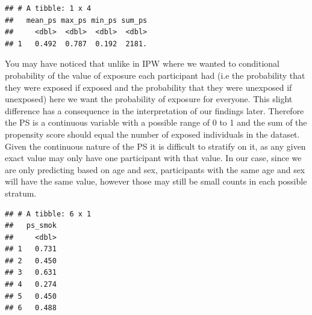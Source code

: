 \documentclass[
]{book}
\newenvironment{Shaded}{\begin{snugshade}}{\end{snugshade}}
\newcommand{\DataTypeTok}[1]{\textcolor[rgb]{0.13,0.29,0.53}{#1}}
\newcommand{\KeywordTok}[1]{\textcolor[rgb]{0.13,0.29,0.53}{\textbf{#1}}}
\newcommand{\NormalTok}[1]{#1}
\newcommand{\OperatorTok}[1]{\textcolor[rgb]{0.81,0.36,0.00}{\textbf{#1}}}
\newcommand{\StringTok}[1]{\textcolor[rgb]{0.31,0.60,0.02}{#1}}
\begin{document}
\begin{Shaded}
\end{Shaded}

\begin{verbatim}
## # A tibble: 1 x 4
##   mean_ps max_ps min_ps sum_ps
##     <dbl>  <dbl>  <dbl>  <dbl>
## 1   0.492  0.787  0.192  2181.
\end{verbatim}

You may have noticed that unlike in IPW where we wanted to conditional probability of the value of exposure each participant had (i.e the probability that they were exposed if exposed and the probability that they were unexposed if unexposed) here we want the probability of exposure for everyone. This slight difference has a consequence in the interpretation of our findings later. Therefore the PS is a continuous variable with a possible range of 0 to 1 and the sum of the propensity score should equal the number of exposed individuals in the dataset. Given the continuous nature of the PS it is difficult to stratify on it, as any given exact value may only have one participant with that value. In our case, since we are only predicting based on age and sex, participants with the same age and sex will have the same value, however those may still be small counts in each possible stratum.

\begin{Shaded}
\end{Shaded}

\begin{verbatim}
## # A tibble: 6 x 1
##   ps_smok
##     <dbl>
## 1   0.731
## 2   0.450
## 3   0.631
## 4   0.274
## 5   0.450
## 6   0.488
\end{verbatim}
\end{document}
